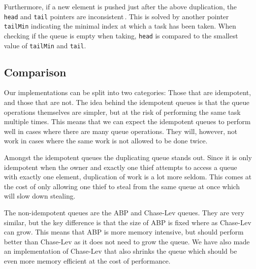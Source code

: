 Furthermore, if a new element is pushed just after the above duplication, the \texttt{head} and \texttt{tail} pointers are inconsistent\,\cite[p. 235]{Leijen:2009:DTP:1639949.1640106}. This is solved by another pointer \texttt{tailMin} indicating the minimal index at which a task has been taken. When checking if the queue is empty when taking, \texttt{head} is compared to the smallest value of \texttt{tailMin} and \texttt{tail}.

\subsection{Comparison}
Our implementations can be split into two categories: Those that are idempotent, and those that are not. The idea behind the idempotent queues is that the queue operations themselves are simpler, but at the risk of performing the same task multiple times. This means that we can expect the idempotent queues to perform well in cases where there are many queue operations. They will, however, not work in cases where the same work is not allowed to be done twice.

Amongst the idempotent queues the duplicating queue stands out. Since it is only idempotent when the owner and exactly one thief attempts to access a queue with exactly one element, duplication of work is a lot more seldom. This comes at the cost of only allowing one thief to steal from the same queue at once which will slow down stealing.

The non-idempotent queues are the ABP and Chase-Lev queues. They are very similar, but the key difference is that the size of ABP is fixed where as Chase-Lev can grow. This means that ABP is more memory intensive, but should perform better than Chase-Lev as it does not need to grow the queue. We have also made an implementation of Chase-Lev that also shrinks the queue which should be even more memory efficient at the cost of performance.
